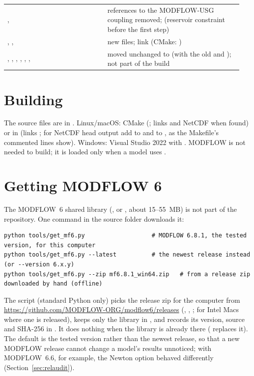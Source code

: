 \begin{table}[!htbp]
\begin{tabular}{P{0.4\linewidth}P{0.548\linewidth}}
,  & references to the MODFLOW-USG coupling removed;  (reservoir constraint before the first step)\\
, ,  & new files; link  (CMake: )\\
, , , , , ,  & moved unchanged to  (with the old  and ); not part of the build\\\bottomrule
\end{tabular}
\end{table}

\section{Building}
The source files are in . Linux/macOS: CMake (; links  and
NetCDF when found) or  in  (links ; for NetCDF head output add  to
 and  to , as the Makefile's commented lines show). Windows: Visual Studio 2022 with
. MODFLOW is not
needed to build; it is loaded only when a model uses .

\section{Getting MODFLOW 6}\label{sec:getmf6}
The MODFLOW~6 shared library (,  or , about 15--55~MB) is not part of
the repository. One command in the source folder downloads it:
\begin{lstlisting}
python tools/get_mf6.py                   # MODFLOW 6.8.1, the tested version, for this computer
python tools/get_mf6.py --latest          # the newest release instead (or --version 6.x.y)
python tools/get_mf6.py --zip mf6.8.1_win64.zip   # from a release zip downloaded by hand (offline)
\end{lstlisting}
The script (standard Python only) picks the release zip for the computer from
\url{https://github.com/MODFLOW-ORG/modflow6/releases} (, ,
;  for Intel Macs where one is released), keeps only the library in
, and records its version, source and SHA-256 in . It does nothing when the
library is already there ( replaces it). The default is the tested version rather than the newest release,
so that a new MODFLOW release cannot change a model's results unnoticed; with MODFLOW~6.6, for example, the Newton
option behaved differently (Section~\ref{sec:relaudit}).

